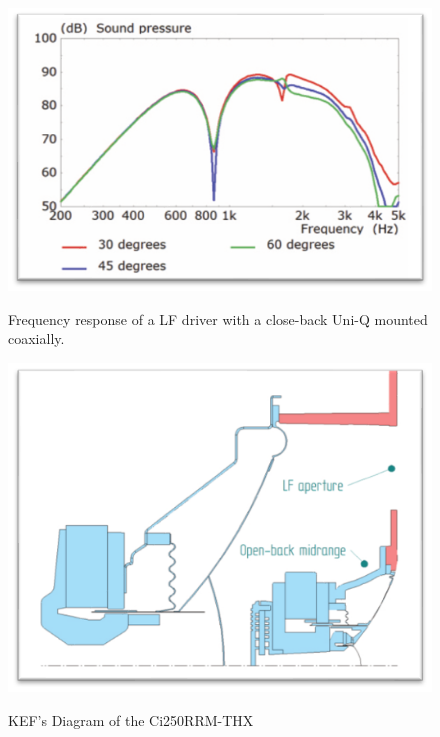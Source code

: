 \documentclass{report}
\begin{document}
        \begin{figure}[H]
            \begin{minipage}{.49\textwidth}
                \includegraphics[width=\linewidth]{figs/KEFpressure.png}%
                \centering
                \caption{Frequency response of a LF driver with a close-back Uni-Q mounted coaxially.}
                \label{KEFpressure} \cite{KEFCi}
            \end{minipage}
            \begin{minipage}{.49\textwidth}
                \includegraphics[width=\linewidth]{figs/KEFdiagram.png}%
                \centering
                \caption{KEF's Diagram of the Ci250RRM-THX}\cite{KEFCi}
                \label{KEFdiagram}
        \end{minipage}
        \end{figure}
\end{document}
